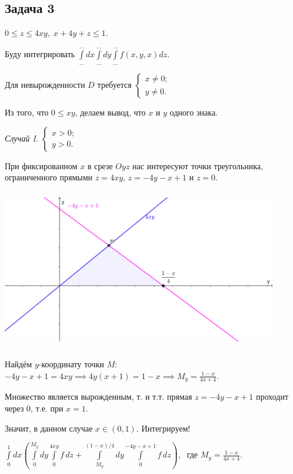 \documentclass[a4paper, fleqn]{article}
\begin{document}
    
    \subsection*{Задача 3}
    
    $0 \leq z \leq 4xy, \; x + 4y + z \leq 1. $
    
    Буду интегрировать $\displaystyle \int \limits_{\dots}^{\dots} dx \int \limits_{\dots}^{\dots} dy \int \limits_{\dots}^{\dots} f(x, y, x) dz.$
    
    Для невырожденности $D$ требуется $\begin{cases} x \neq 0; \\ y \neq 0. \end{cases}$
    
    Из того, что $0 \leq xy$, делаем вывод, что $x$  и $y$ одного знака.
    
    \textit{Случай I.} $\begin{cases} x > 0; \\ y > 0. \end{cases}$
    
    При фиксированном $x$ в срезе $Oyz$ нас интересуют точки треугольника, ограниченного прямыми $z = 4xy$, $z = -4y - x + 1$ и $z = 0$.
    
   \includegraphics[width=12cm, height=7cm]{list24imgs/task 2.4.5.png}
   
   Найдём $y$-координату точки $M$: $ -4y -x + 1 = 4xy \implies 4y(x + 1) = 1 - x \implies M_y = \frac{1 - x}{4x  + 4}.$
   
   Множество является вырожденным, т. и т.т. прямая $z = -4y - x + 1$ проходит через $0$, т.е. при $x = 1.$
   
   Значит, в данном случае $x \in (0, 1)$. Интегрируем!
   
   $\displaystyle \int \limits_{0}^{1} dx \left( \int \limits_{0}^{M_y} dy \int \limits_{0}^{4xy} f \,  dz + \int \limits_{M_y}^{(1 - x)/4} dy \int \limits_{0}^{-4y - x + 1} f \,  dz \right), \; $ где  $M_y = \frac{1 - x}{4x  + 4}$.
   
\end{document}

